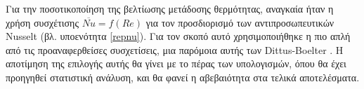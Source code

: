 Για την ποσοτικοποίηση της βελτίωσης μετάδοσης θερμότητας, αναγκαία ήταν η χρήση συσχέτισης $\overline{Nu} = f(Re)$ για τον προσδιορισμό των αντιπροσωπευτικών Nusselt (βλ. υποενότητα \ref{repnu}). Για τον σκοπό αυτό χρησιμοποιήθηκε η πιο απλή από τις προαναφερθείσες συσχετίσεις, μια παρόμοια αυτής των Dittus-Boelter \cite{1930_Dittus}. Η αποτίμηση της επιλογής αυτής θα γίνει με το πέρας των υπολογισμών, όπου θα έχει προηγηθεί στατιστική ανάλυση, και θα φανεί η αβεβαιότητα στα τελικά αποτελέσματα.